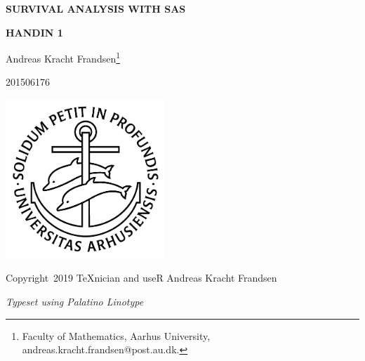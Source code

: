 \documentclass[a4paper,oneside]{memoir}
\title{}
\author{}
\date{}
\let\rmarkdownfootnote\footnote%
\def\footnote{\protect\rmarkdownfootnote}
\begin{document}
\begin{titlingpage}
    \begin{center}
        \vspace*{1cm}
        
        \LARGE \textbf{SURVIVAL ANALYSIS WITH SAS}
        
        \vspace{5mm}
    
        \renewcommand{\thefootnote}{\fnsymbol{footnote}}
        \large \textbf{HANDIN 1}
        
        \vspace{2mm}
        
        \Large Andreas Kracht Frandsen\footnote{Faculty of Mathematics, Aarhus University, andreas.kracht.frandsen@post.au.dk.}
        
        \vspace{1mm}
        
        \Large 201506176
        
        \vfill
        
        \includegraphics[width=0.45\textwidth]{latex/ausegl_sort}
        
        \vfill
        
    \end{center}
\end{titlingpage}

\newpage

\vspace*{\fill}

Copyright \textcopyright\,2019 \TeX nician and useR Andreas Kracht Frandsen

\textit{Typeset using Palatino Linotype}

\newpage


\tableofcontents

\newpage
\end{document}
